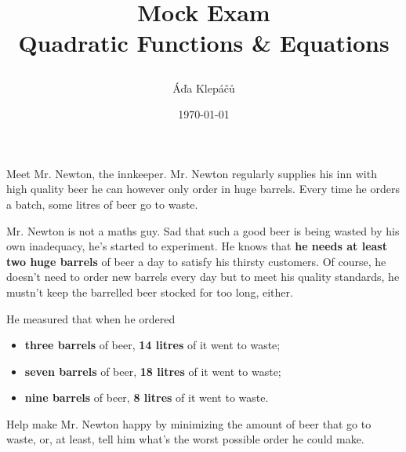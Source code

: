\documentclass[a4paper,11pt]{article}
\title{\Huge\textsf{Mock Exam}\\
 \Large\textsf{Quadratic Functions \& Equations}
 \author{Áďa Klepáčů}
 \date{\today}
}
\begin{document}
\maketitle
\thispagestyle{fancy}

Meet Mr. Newton, the innkeeper. Mr. Newton regularly supplies his inn with high
quality beer he can however only order in huge barrels. Every time he orders a
batch, some litres of beer go to waste.

Mr. Newton is not a maths guy. Sad that such a good beer is being wasted by his
own inadequacy, he's started to experiment. He knows that \textbf{he needs at
least two huge barrels} of beer a day to satisfy his thirsty customers. Of
course, he doesn't need to order new barrels every day but to meet his quality
standards, he mustn't keep the barrelled beer stocked for too long, either.

He measured that when he ordered
\begin{itemize}
 \item \textbf{three barrels} of beer, \textbf{14 litres} of it went to waste;
 \item \textbf{seven barrels} of beer, \textbf{18 litres} of it went to waste;
 \item \textbf{nine barrels} of beer, \textbf{8 litres} of it went to waste.
\end{itemize}

Help make Mr. Newton happy by minimizing the amount of beer that go to waste,
or, at least, tell him what's the worst possible order he could make.
\end{document}
